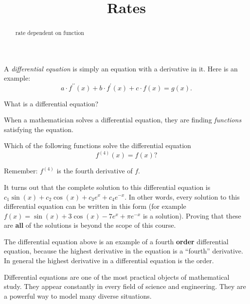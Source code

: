 \documentclass{ximera}
\title{Rates}
\begin{document}
\begin{abstract}
  rate dependent on function
\end{abstract}
\maketitle

A \textit{differential equation} is
simply an equation with a derivative in it. Here is an example:
\[
a \cdot f^{\prime\prime}(x) + b \cdot f^{\prime}(x) + c \cdot f(x) = g(x). 
\]
\begin{question}
  What is a differential equation?
  \begin{multipleChoice}
  \end{multipleChoice}
\end{question}








When a mathematician solves a differential equation, they are finding
\textit{functions} satisfying the equation.
\begin{example}
  Which of the following functions solve the differential equation
  \[
  f^{(4)}(x) = f(x)?
  \]

    Remember: $f^{(4)}$ is the fourth derivative of $f$.

    It turns out that the complete solution to this differential equation
    is $c_1\sin(x)+c_2\cos(x)+c_3e^x+c_4e^{-x}$.  In other words, every
    solution to this differential equation can be written in this form
    (for example $f(x) =
    \sin(x)+3\cos(x)-7e^x+\pi e^{-x}$ is a solution).  Proving that these
    are \textbf{all} of the solutions is beyond the scope of this course.

\end{example}


The differential equation above is an example of a fourth \textbf{order}
differential equation, because the highest derivative in the equation
is a ``fourth'' derivative. In general the highest derivative in a
differential equation is the order.


Differential equations are one of the most practical objects of
mathematical study.  They appear constantly in every field of science
and engineering.  They are a powerful way to model many diverse
situations.
\end{document}
